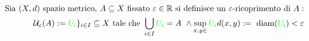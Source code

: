 \documentclass[preview]{standalone}
\begin{document}
\begin{align*}
\text{Sia } (X, d) \text{ spazio metrico, } A \subseteq X \text{ fissato } \varepsilon \in \mathbb{R} \text{ si definisce un } \varepsilon\text{-ricoprimento di } A: \\ \mathcal{U}_{\varepsilon}(A) :=  { \textcolor{green}{U_i} \}_{i \in I} \subseteq X \text{ tale che } \bigcup_{i \in I}  \textcolor{green}{U_i}  = A  \ \land \sup_{x,y \in } \textcolor{green}{U_i}  d(x,y) := \text{ diam}( \textcolor{green}{U_i} ) < \varepsilon}
\end{align*}
\end{document}
